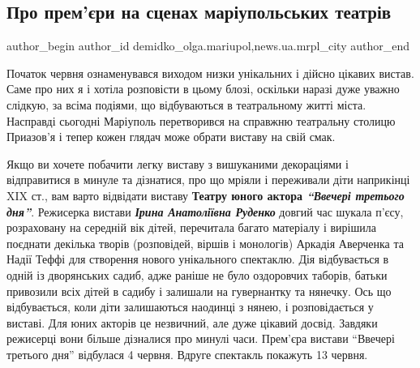  
 
 
 
 
 
\subsection{Про прем'єри на сценах маріупольських театрів}
\label{sec:05_06_2021.stz.news.ua.mrpl_city.1.premjery}
 
\ifcmt
 author_begin
   author_id demidko_olga.mariupol,news.ua.mrpl_city
 author_end
\fi

Початок червня ознаменувався виходом низки унікальних і дійсно цікавих вистав.
Саме про них я і хотіла розповісти в цьому блозі, оскільки наразі дуже уважно
слідкую, за всіма подіями, що відбуваються в театральному житті міста.
Насправді сьогодні Маріуполь перетворився на справжню театральну столицю
Приазов'я і тепер кожен глядач може обрати виставу на свій смак.


Якщо ви хочете побачити легку виставу з вишуканими декораціями і відправитися в
минуле та дізнатися, про що мріяли і переживали діти наприкінці XIX ст., вам
варто відвідати виставу \textbf{Театру юного актора \emph{\enquote{Ввечері третього дня}}}. Режисерка
вистави \emph{\textbf{Ірина Анатоліївна Руденко}} довгий час шукала п'єсу, розраховану на
середній вік дітей, перечитала багато матеріалу і вирішила поєднати декілька
творів (розповідей, віршів і монологів) Аркадія Аверченка та Надії Теффі для
створення нового унікального спектаклю. Дія відбувається в одній із дворянських
садиб, адже раніше не було оздоровчих таборів, батьки привозили всіх дітей в
садибу і залишали на гувернантку та нянечку. Ось що відбувається, коли діти
залишаються наодинці з нянею, і розповідається у виставі. Для юних акторів це
незвичний, але дуже цікавий досвід. Завдяки режисерці вони більше дізналися про
минулі часи. Прем'єра вистави \enquote{Ввечері третього дня} відбулася 4 червня. Вдруге
спектакль покажуть 13 червня.

